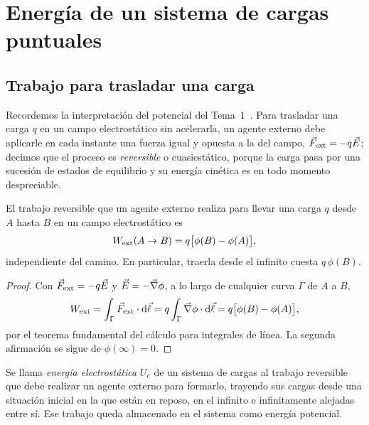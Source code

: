 \section{Energía de un sistema de cargas puntuales}\label{sec:puntuales}

\subsection{Trabajo para trasladar una carga}

Recordemos la interpretación del potencial del Tema~1~\cite{T1}. Para trasladar una carga $q$ en un campo
electrostático sin acelerarla, un agente externo debe aplicarle en cada instante una fuerza igual y opuesta a la del
campo, $\vec F_{\mathrm{ext}}=-q\vec E$; decimos que el proceso es \emph{reversible} o cuasiestático, porque la carga pasa por una
sucesión de estados de equilibrio y su energía cinética es en todo momento despreciable.

\begin{lema}\label{lem:trabajo}
El trabajo reversible que un agente externo realiza para llevar una carga $q$ desde $A$ hasta $B$ en un campo
electrostático es
\begin{equation}\label{eq:trabajo}
  W_{\mathrm{ext}}(A\to B)=q\big[\phi(B)-\phi(A)\big] ,
\end{equation}
independiente del camino. En particular, traerla desde el infinito cuesta $q\,\phi(B)$.
\end{lema}

\begin{proof}
Con $\vec F_{\mathrm{ext}}=-q\vec E$ y $\vec E=-\vec\nabla\phi$, a lo largo de cualquier curva $\Gamma$ de $A$ a $B$,
\[
  W_{\mathrm{ext}}=\int_\Gamma\vec F_{\mathrm{ext}}\cdot\mathop{}\!\mathrm{d}\vec\ell=q\int_\Gamma\vec\nabla\phi\cdot\mathop{}\!\mathrm{d}\vec\ell=q\big[\phi(B)-\phi(A)\big],
\]
por el teorema fundamental del cálculo para integrales de línea. La segunda afirmación se sigue de $\phi(\infty)=0$.
\end{proof}

\begin{definicion}\label{def:energia}
Se llama \emph{energía electrostática} $U_e$ de un sistema de cargas al trabajo reversible que debe realizar un agente
externo para formarlo, trayendo sus cargas desde una situación inicial en la que están en reposo, en el infinito e
infinitamente alejadas entre sí. Ese trabajo queda almacenado en el sistema como energía potencial.
\end{definicion}

